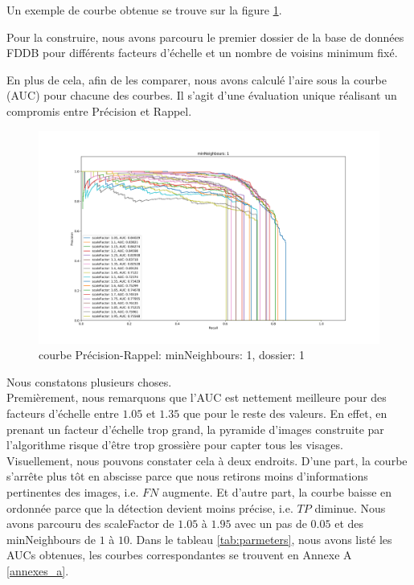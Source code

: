\documentclass[a4paper,11pt]{article}
\begin{document}
        Un exemple de courbe obtenue se trouve sur la figure \ref{fig:minN_1}.

        Pour la construire, nous avons parcouru le premier dossier de la base de données FDDB pour différents facteurs d'échelle et un nombre de voisins minimum fixé.

        En plus de cela, afin de les comparer, nous avons calculé l'aire sous la courbe (AUC) pour chacune des courbes. Il s'agit d'une évaluation unique réalisant un compromis entre Précision et Rappel.
        
    \label{results}
	\begin{figure}[H]
	    \begin{center}
		\includegraphics[scale = 0.4]{images/courbes/folder_01_minN_1.png}
		\caption{courbe Précision-Rappel: minNeighbours: 1, dossier: 1}
		\label{fig:minN_1}
	    \end{center}
	\end{figure}
        Nous constatons plusieurs choses.
        \\
        Premièrement, nous remarquons que l'AUC est nettement meilleure pour des facteurs d'échelle entre $1.05$ et $1.35$ que pour le reste des valeurs.
        En effet, en prenant un facteur d'échelle trop grand, la pyramide d'images construite par l'algorithme risque d'être trop grossière pour capter tous les visages.
        Visuellement, nous pouvons constater cela à deux endroits. 
        D'une part, la courbe s'arrête plus tôt en abscisse parce que nous retirons moins d'informations pertinentes des images, i.e. $FN$ augmente.
        Et d'autre part, la courbe baisse en ordonnée parce que la détection devient moins précise, i.e. $TP$ diminue.
        Nous avons parcouru des scaleFactor de $1.05$ à $1.95$ avec un pas de $0.05$ et des minNeighbours de $1$ à $10$.
        Dans le tableau \ref{tab:parmeters}, nous avons listé les AUCs obtenues, les courbes correspondantes se trouvent en Annexe A \ref{annexes_a}.
\end{document}
